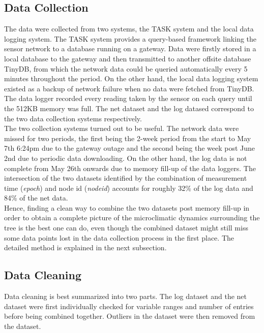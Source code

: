 \documentclass[11pt]{article}
\begin{document}
\subsection{Data Collection}
The data were collected from two systems, the TASK system and the local data logging system. The TASK system provides a query-based framework linking the sensor network to a database running on a gateway. Data were firstly stored in a local database to the gateway and then transmitted to another offsite database TinyDB, from which the network data could be queried automatically every 5 minutes throughout the period. On the other hand, the local data logging system existed as a backup of network failure when no data were fetched from TinyDB. The data logger recorded every reading taken by the sensor on each query until the 512KB memory was full. The net dataset and the log datased correspond to the two data collection systems respectively. \\
The two collection systems turned out to be useful. The network data were missed for two periods, the first being the 2-week period from the start to May 7th 6:24pm due to the gateway outage and the second being the week post June 2nd due to periodic data downloading. On the other hand, the log data is not complete from May 26th onwards due to memory fill-up of the data loggers. The intersection of the two datasets identified by the combination of measurement time (\textit{epoch}) and node id (\textit{nodeid}) accounts for roughly 32\% of the log data and 84\% of the net data.\\
Hence, finding a clean way to combine the two datasets post memory fill-up in order to obtain a complete picture of the microclimatic dynamics surrounding the tree is the best one can do, even though the combined dataset might still miss some data points lost in the data collection process in the first place. The detailed method is explained in the next subsection.

\subsection{Data Cleaning}
Data cleaning is best summarized into two parts. The log dataset and the net dataset were first individually checked for variable ranges and number of entries before being combined together. Outliers in the dataset were then removed from the dataset. 
\end{document}
